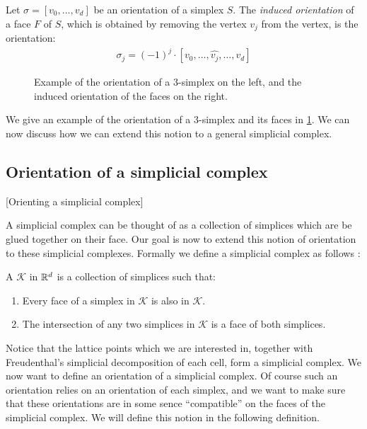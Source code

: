 \begin{definition}
    Let $\sigma = [v_0, \dots, v_{d}]$ be an orientation of a simplex $S$. The \emph{induced orientation} of a face $F$ of $S$, which is obtained by removing the vertex $v_j$ from the vertex, is the orientation:
    \begin{align*}
        \sigma_j = (-1)^j \cdot [v_0, \dots, \hat{v_j}, \dots, v_{d}]
    \end{align*}
\end{definition}

\begin{figure}[ht]
    \centering
    \caption[Orientation of a simplex]{Example of the orientation of a 3-simplex on the left, and the induced orientation of the faces on the right.}
    \label{fig:orientation_of_simplex}
\end{figure}

We give an example of the orientation of a 3-simplex and its faces in \cref{fig:orientation_of_simplex}. We can now discuss how we can extend this notion to a general simplicial complex.

\subsection{Orientation of a simplicial complex}[Orienting a simplicial complex]

A simplicial complex can be thought of as a collection of simplices which are be glued together on their face. Our goal is now to extend this notion of orientation to these simplicial complexes. Formally we define a simplicial complex as follows :

\begin{definition}
    A  $\mathcal{K}$ in $\mathbb{R}^d$ is a collection of simplices such that:
    \begin{enumerate}
        \item Every face of a simplex in $\mathcal{K}$ is also in $\mathcal{K}$.
        \item The intersection of any two simplices in $\mathcal{K}$ is a face of both simplices.
    \end{enumerate}
\end{definition}

Notice that the lattice points which we are interested in, together with Freudenthal's simplicial decomposition of each cell, form a simplicial complex. We now want to define an orientation of a simplicial complex. Of course such an orientation relies on an orientation of each simplex, and we want to make sure that these orientations are in some sence ``compatible'' on the faces of the simplicial complex. We will define this notion in the following definition.

